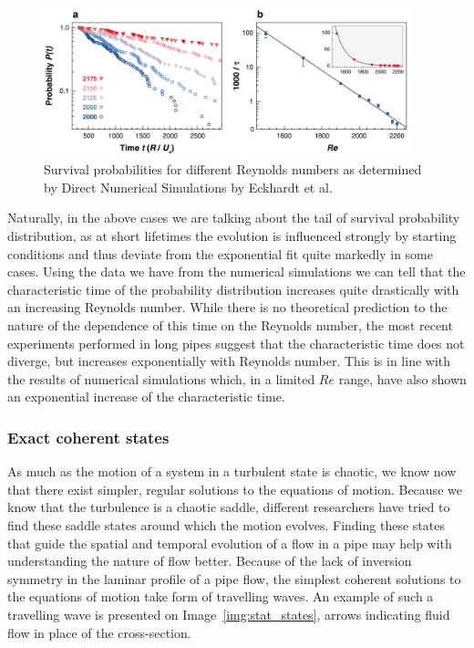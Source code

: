 \documentclass[11pt,a4paper]{article}
\begin{document}
\begin{figure}[h!]
    \centering
    \includegraphics[width=0.95\textwidth]{decay_prob.png}
    \caption{Survival probabilities for different Reynolds numbers as determined by Direct Numerical Simulations by Eckhardt et al\cite{Eckhardt02}.}\label{img:decay_plot}
\end{figure}

Naturally, in the above cases we are talking about the tail of survival probability distribution, as at short lifetimes the evolution is influenced strongly by starting conditions and thus deviate from the exponential fit quite markedly in some cases.
Using the data we have from the numerical simulations we can tell that the characteristic time of the probability distribution increases quite drastically with an increasing Reynolds number.
While there is no theoretical prediction to the nature of the dependence of this time on the Reynolds number, the most recent experiments performed in long pipes suggest that the characteristic time does not diverge, but increases exponentially with Reynolds number.
This is in line with the results of numerical simulations which, in a limited \(Re\) range, have also shown an exponential increase of the characteristic time.

\subsubsection{Exact coherent states}
As much as the motion of a system in a turbulent state is chaotic, we know now that there exist simpler, regular solutions to the equations of motion.
Because we know that the turbulence is a chaotic saddle, different researchers have tried to find these saddle states around which the motion evolves\cite{Clever92}\cite{Clever97}\cite{Nagata90}\cite{Faisst00}.
Finding these states that guide the spatial and temporal evolution of a flow in a pipe may help with understanding the nature of flow better.
Because of the lack of inversion symmetry in the laminar profile of a pipe flow, the simplest coherent solutions to the equations of motion take form of travelling waves.
An example of such a travelling wave is presented on Image~\ref{img:stat_states}, arrows indicating fluid flow in place of the cross-section.
\end{document}
